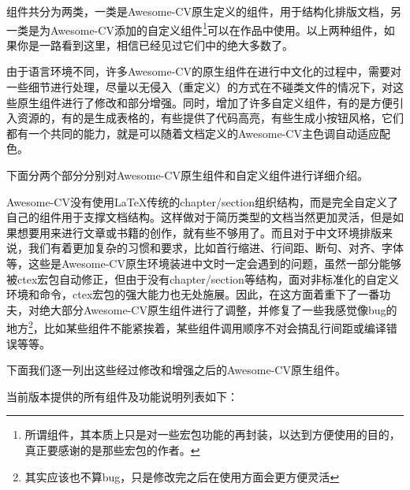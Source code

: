 组件共分为两类，一类是Awesome-CV原生定义的组件，用于结构化排版文档，另一类是{\dk}为Awesome-CV添加的自定义组件\footnote{所谓组件，其本质上只是对一些宏包功能的再封装，以达到方便使用的目的，真正要感谢的是那些宏包的作者。}可以在作品中使用。以上两种组件，如果你是一路看到这里，相信已经见过它们中的绝大多数了。

由于语言环境不同，许多Awesome-CV的原生组件在进行中文化的过程中，需要对一些细节进行处理，{\dk}尽量以无侵入（重定义）的方式在不碰类文件的情况下，对这些原生组件进行了修改和部分增强。同时，{\dk}增加了许多自定义组件，有的是方便引入资源的，有的是生成表格的，有些提供了代码高亮，有些生成小按钮风格，它们都有一个共同的能力，就是可以随着文档定义的Awesome-CV主色调自动适应配色。

下面分两个部分分别对Awesome-CV原生组件和{\dk}自定义组件进行详细介绍。

Awesome-CV没有使用{\LaTeX}传统的chapter/section组织结构，而是完全自定义了自己的组件用于支撑文档结构。这样做对于简历类型的文档当然更加灵活，但是如果想要用来进行文章或书籍的创作，就有些不够用了。而且对于中文环境排版来说，我们有着更加复杂的习惯和要求，比如首行缩进、行间距、断句、对齐、字体等，这些是Awesome-CV原生环境装进中文时一定会遇到的问题，虽然一部分能够被ctex宏包自动修正，但由于没有chapter/section等结构，面对非标准化的自定义环境和命令，ctex宏包的强大能力也无处施展。因此，{\dk}在这方面着重下了一番功夫，对绝大部分Awesome-CV原生组件进行了调整，并修复了一些我感觉像bug的地方\footnote{其实应该也不算bug，只是修改完之后在使用方面会更方便灵活}，比如某些组件不能紧挨着，某些组件调用顺序不对会搞乱行间距或编译错误等等。

下面我们逐一列出这些经过修改和增强之后的Awesome-CV原生组件。

\begin{cventries}
\end{cventries}

{\dk}当前版本提供的所有组件及功能说明列表如下：

